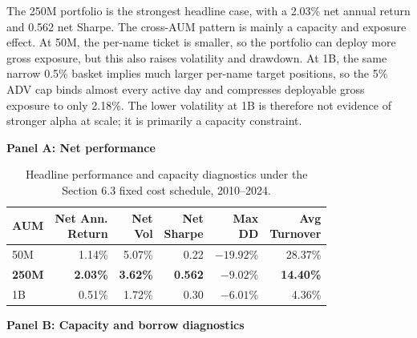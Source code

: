 \documentclass[12pt,a4paper]{article}
\begin{document}
The 250M portfolio is the strongest headline case, with a 2.03\% net annual
return and 0.562 net Sharpe. The cross-AUM pattern is mainly a capacity and
exposure effect. At 50M, the per-name ticket is smaller, so the portfolio can
deploy more gross exposure, but this also raises volatility and drawdown. At
1B, the same narrow 0.5\% basket implies much larger per-name target positions,
so the 5\% ADV cap binds almost every active day and compresses deployable gross
exposure to only 2.18\%. The lower volatility at 1B is therefore not evidence of
stronger alpha at scale; it is primarily a capacity constraint.

\begin{table}[H]
\centering
\caption{Headline performance and capacity diagnostics under the Section 6.3 fixed cost schedule, 2010--2024.}
\label{tab:step5_headline}

\vspace{0.4em}
\small
\renewcommand{\arraystretch}{1.18}

\textbf{Panel A: Net performance}

\vspace{0.25em}
\setlength{\tabcolsep}{9pt}
\begin{tabular}{lrrrrr}
\toprule
\textbf{AUM} &
\shortstack{\textbf{Net Ann.}\\\textbf{Return}} &
\shortstack{\textbf{Net}\\\textbf{Vol}} &
\shortstack{\textbf{Net}\\\textbf{Sharpe}} &
\shortstack{\textbf{Max}\\\textbf{DD}} &
\shortstack{\textbf{Avg}\\\textbf{Turnover}} \\
\midrule
50M
& 1.14\% & 5.07\% & 0.22  & $-19.92\%$ & 28.37\% \\
\textbf{250M}
& \textbf{2.03\%} & \textbf{3.62\%} & \textbf{0.562}
& \textbf{$-9.02\%$} & \textbf{14.40\%} \\
1B
& 0.51\% & 1.72\% & 0.30  & $-6.01\%$ & 4.36\% \\
\bottomrule
\end{tabular}

\vspace{1.0em}

\textbf{Panel B: Capacity and borrow diagnostics}


\end{table}
\end{document}

